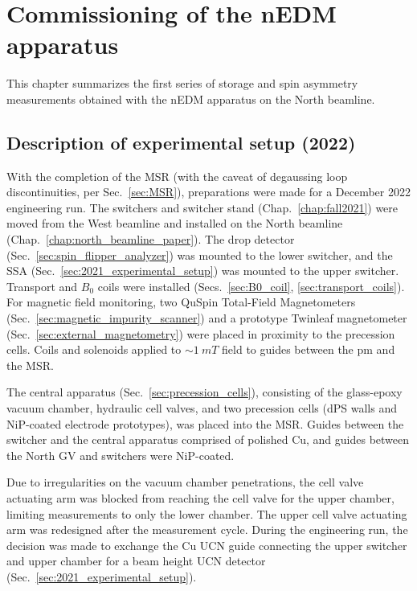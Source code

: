 
\chapter{Commissioning of the nEDM apparatus}\label{chap:nEDM_commissioning_dec2022}


This chapter summarizes the first series of storage and spin asymmetry measurements obtained with the nEDM apparatus on the North beamline. 


\section{Description of experimental setup (2022)}


With the completion of the MSR (with the caveat of degaussing loop discontinuities, per Sec.~\ref{sec:MSR}), preparations were made for a December 2022 engineering run. The switchers and switcher stand (Chap.~\ref{chap:fall2021}) were moved from the West beamline and installed on the North beamline (Chap.~\ref{chap:north_beamline_paper}). The drop detector (Sec.~\ref{sec:spin_flipper_analyzer}) was mounted to the lower switcher, and the SSA (Sec.~\ref{sec:2021_experimental_setup}) was mounted to the upper switcher. Transport and $B_0$ coils were installed (Secs.~\ref{sec:B0_coil}, \ref{sec:transport_coils}). For magnetic field monitoring, two QuSpin Total-Field Magnetometers (Sec.~\ref{sec:magnetic_impurity_scanner}) and a prototype Twinleaf magnetometer (Sec.~\ref{sec:external_magnetometry}) were placed in proximity to the precession cells. Coils and solenoids applied to $\sim \qty{1}{mT}$ field to guides between the \acrshort{pm} and the MSR.

The central apparatus (Sec.~\ref{sec:precession_cells}), consisting of the glass-epoxy vacuum chamber, hydraulic cell valves, and two precession cells (dPS walls and NiP-coated electrode prototypes), was placed into the MSR. Guides between the switcher and the central apparatus comprised of polished Cu, and guides between the North GV and switchers were NiP-coated.

Due to irregularities on the vacuum chamber penetrations, the cell valve actuating arm was blocked from reaching the cell valve for the upper chamber, limiting measurements to only the lower chamber. The upper cell valve actuating arm was redesigned after the measurement cycle. During the engineering run, the decision was made to exchange the Cu UCN guide connecting the upper switcher and upper chamber for a beam height UCN detector (Sec.~\ref{sec:2021_experimental_setup}).


